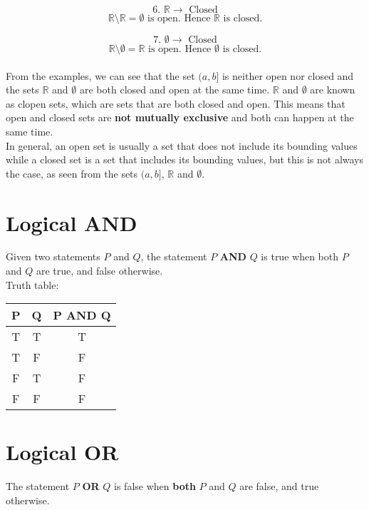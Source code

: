 \documentclass[11pt]{article}
\begin{document}
\[\text{6. } \mathbb{R} \rightarrow \text{ Closed}\]
\[\mathbb{R} \setminus \mathbb{R} = \emptyset \text{ is open. Hence } \mathbb{R} \text{ is closed.}\]

\[\text{7. } \emptyset \rightarrow \text{ Closed}\]
\[\mathbb{R} \setminus \emptyset = \mathbb{R} \text{ is open. Hence } \emptyset \text{ is closed.}\]
\\[0pt]

From the examples, we can see that the set \((a, b]\) is neither open nor closed and the sets \(\mathbb{R}\) and \(\emptyset\) are both closed and open at the same time. \(\mathbb{R}\) and \(\emptyset\) are known as clopen sets, which are sets that are both closed and open. This means that open and closed sets are \textbf{not mutually exclusive} and both can happen at the same time.
\\[0pt]

In general, an open set is usually a set that does not include its bounding values while a closed set is a set that includes its bounding values, but this is not always the case, as seen from the sets \((a, b]\), \(\mathbb{R}\) and \(\emptyset\).


\section{Logical AND}
\label{sec:orgb84b2ac}
Given two statements \(P\) and \(Q\), the statement \(P\) \textbf{AND} \(Q\) is true when both \(P\) and \(Q\) are true, and false otherwise.
\\[0pt]

Truth table:

\begin{center}
\begin{tabular}{ |c|c|c| }
\hline
P & Q & P AND Q \\
\hline
T & T & T \\
\hline
T & F & F \\
\hline
F & T & F \\
\hline
F & F & F \\
\hline
\end{tabular}
\end{center}


\section{Logical OR}
\label{sec:orgd39ea75}
The statement \(P\) \textbf{OR} \(Q\) is false when \textbf{both} \(P\) and \(Q\) are false, and true otherwise.
\\[0pt]
\end{document}
